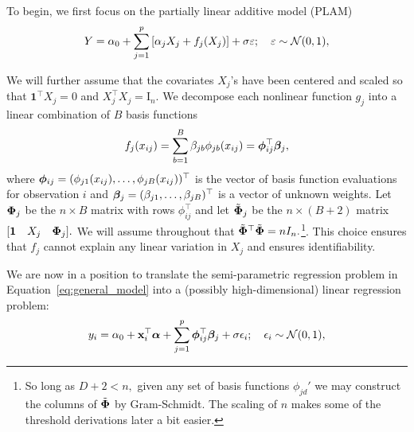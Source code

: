 
To begin, we first focus on the partially linear additive model (PLAM)
\begin{equation}
\label{eq:general_model}
Y = \alpha_{0} + \sum_{j = 1}^{p}{[\alpha_{j}X_{j} + f_{j}(X_{j})]} + \sigma \varepsilon; \quad \varepsilon \sim \mathcal{N}(0,1),
\end{equation}

We will further assume that the covariates $X_{j}$'s have been centered and scaled so that $\mathbf{1}^{\top}X_{j} = 0$ and $X_{j}^{\top}X_{j} = \text{I}_{n}.$
We decompose each nonlinear function $g_{j}$ into a linear combination of $B$ basis functions
$$
f_{j}(x_{ij}) = \sum_{b = 1}^{B}{\beta_{jb}\phi_{jb}(x_{ij})} = \boldsymbol{\phi}_{ij}^{\top}\boldsymbol{\beta}_{j},
$$
where $\boldsymbol{\phi}_{ij} = (\phi_{j1}(x_{ij}), \ldots, \phi_{jB}(x_{ij}))^{\top}$ is the vector of basis function evaluations for observation $i$ and $\boldsymbol{\beta}_{j} = (\beta_{j1}, \ldots, \beta_{jB})^{\top}$ is a vector of unknown weights.
Let $\boldsymbol{\Phi}_{j}$ be the $n \times B$ matrix with rows $\phi_{ij}^{\top}$ and let $\tilde{\boldsymbol{\Phi}}_{j}$ be the $n \times (B + 2)$ matrix $[\mathbf{1} \quad X_{j} \quad \boldsymbol{\Phi}_{j}].$
We will assume throughout that $\tilde{\boldsymbol{\Phi}}^{\top}\tilde{\boldsymbol{\Phi}} = nI_{n}.$\footnote{So long as $D + 2 < n,$ given any set of basis functions $\phi_{jd}'$ we may construct the columns of $\tilde{\boldsymbol{\Phi}}$ by Gram-Schmidt. The scaling of $n$ makes some of the threshold derivations later a bit easier.}.
This choice ensures that $f_{j}$ cannot explain any linear variation in $X_{j}$ and ensures identifiability.

We are now in a position to translate the semi-parametric regression problem in Equation~\eqref{eq:general_model} into a (possibly high-dimensional) linear regression problem:
\begin{equation}
\label{eq:general_model_linear_form}
y_{i} = \alpha_{0} + \mathbf{x}_{i}^{\top}\boldsymbol{\alpha} + \sum_{j = 1}^{p}{\boldsymbol{\phi}_{ij}^{\top}\boldsymbol{\beta}_{j}} + \sigma \epsilon_{i}; \quad \epsilon_{i} \sim \mathcal{N}(0,1),
\end{equation}



